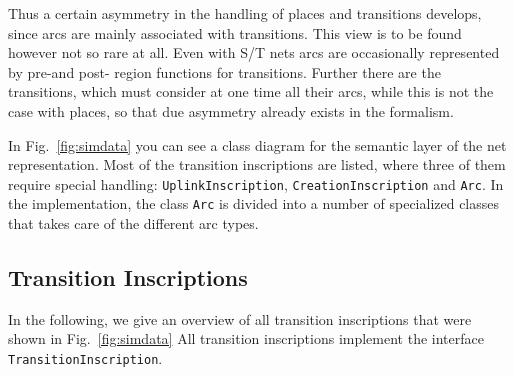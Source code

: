 Thus a certain asymmetry in the handling of places and transitions
develops, since arcs are mainly associated with transitions.
This view is to be found however not so rare at all. Even with S/T nets
arcs are occasionally represented by pre-and post- region functions for
transitions. Further there are the transitions, which must consider at one
time all their arcs, while this is not the case with places, so that due
asymmetry already exists in the formalism.


In Fig.~\ref{fig:simdata} you 
can see a class diagram for the semantic layer of the
net representation.
Most of the transition inscriptions are listed, where three
of them require special handling: \texttt{UplinkInscription}, 
\texttt{CreationInscription} and \texttt{Arc}. 
In the implementation, the class \texttt{Arc} is divided into a
number of specialized classes that takes care of the different arc types.


\subsection{Transition Inscriptions}

In the following, we give an overview of all transition inscriptions that
were shown in Fig.~\ref{fig:simdata} All transition inscriptions implement the
interface \texttt{TransitionInscription}.

